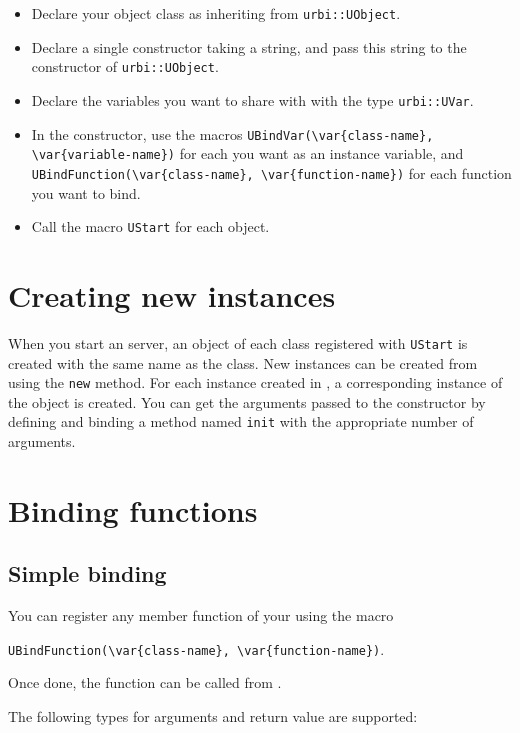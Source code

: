\begin{itemize}
\item Declare your object class as inheriting from
  \lstinline{urbi::UObject}.
\item Declare a single constructor taking a string, and pass this
  string to the constructor of \lstinline{urbi::UObject}.
\item Declare the variables you want to share with \urbi with the type
  \lstinline{urbi::UVar}.
\item In the constructor, use the macros
  \lstinline|UBindVar(\var{class-name}, \var{variable-name})|
  for each \UVar you want as an instance variable, and
  \lstinline|UBindFunction(\var{class-name}, \var{function-name})| for
  each function you want to bind.
\item Call the macro \lstinline{UStart} for each object.
\end{itemize}

\section{Creating new instances}

When you start an \urbi server, an object of each class registered
with \lstinline{UStart} is created with the same name as the
class. New instances can be created from \urbi using the
\lstinline|new| method. For each instance created in \urbi, a
corresponding instance of the \Cxx object is created. You can get the
arguments passed to the constructor by defining and binding a method
named \lstinline|init| with the appropriate number of arguments.

\section{Binding functions}

\subsection{Simple binding}
\label{sec:uobject:simple-binding}
You can register any member function of your \UObject using the macro

\lstinline|UBindFunction(\var{class-name}, \var{function-name})|.

Once done, the function can be called from \us.

The following types for arguments and return value are supported:

